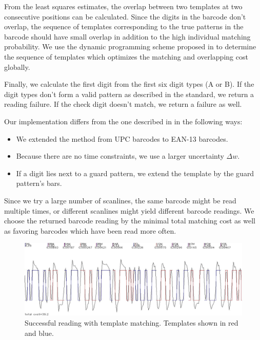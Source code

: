 From the least squares estimates, the overlap between two templates at two
consecutive positions can be calculated.
Since the digits in the barcode don't overlap, the sequence of templates corresponding
to the true patterns in the barcode should have small overlap in addition to the
high individual matching probability. We use the dynamic programming scheme
proposed in \cite{Gallo2011} to determine the sequence of templates which
optimizes the matching and overlapping cost globally.

Finally, we calculate the first digit from the first six digit types (A or B).
If the digit types don't form a valid pattern as described in the standard, we
return a reading failure. If the check digit doesn't match, we return a failure
as well.

Our implementation  differs from the one described in \cite{Gallo2011} in the
following ways:
\begin{itemize}
\item We extended the method from UPC barcodes to EAN-13 barcodes.
\item Because there are no time constraints, we use a larger uncertainty
  $\Delta w$.
\item If a digit lies next to a guard pattern, we extend the template by the
  guard pattern's bars.
\end{itemize}

Since we try a large number of scanlines, the same barcode might be read
multiple times, or different scanlines might yield different barcode readings.
We choose the returned barcode reading by the minimal total matching cost as well as
favoring barcodes which have been read more often.
\begin{figure}[t]
\center
\includegraphics[width=\textwidth]{img/tmpl.jpg}
\caption{Successful reading with template matching. Templates shown in red and blue.}
\label{tmpl}
\end{figure}





